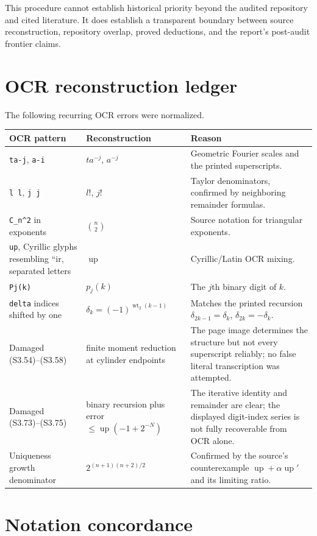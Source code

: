 \documentclass[11pt,oneside]{article}
\theoremstyle{definition}
\theoremstyle{remark}
\newcommand{\Up}{\operatorname{up}}
\newcommand{\wt}{\operatorname{wt}_2}
\begin{document}
This procedure cannot establish historical priority beyond the audited repository and cited
literature.  It does establish a transparent boundary between source reconstruction,
repository overlap, proved deductions, and the report's post-audit frontier claims.

\section{OCR reconstruction ledger}
\label{app:ocr}

The following recurring OCR errors were normalized.

\begin{longtable}{@{}p{}p{}p{}@{}}
\toprule
OCR pattern & Reconstruction & Reason\\
\midrule
\endhead
\texttt{ta-j}, \texttt{a-i} & $ta^{-j}$, $a^{-j}$ & Geometric Fourier scales and the printed superscripts.\\
\texttt{l l}, \texttt{j j} & $l!$, $j!$ & Taylor denominators, confirmed by neighboring remainder formulas.\\
\texttt{C\_n\textasciicircum 2} in exponents & $\binom n2$ & Source notation for triangular exponents.\\
\texttt{up}, Cyrillic glyphs resembling ``ir, separated letters & $\Up$ & Cyrillic/Latin OCR mixing.\\
\texttt{Pj(k)} & $p_j(k)$ & The $j$th binary digit of $k$.\\
\texttt{delta} indices shifted by one & $\delta_k=(-1)^{\wt(k-1)}$ & Matches the printed recursion $\delta_{2k-1}=\delta_k$, $\delta_{2k}=-\delta_k$.\\
Damaged (S3.54)--(S3.58) & finite moment reduction at cylinder endpoints & The page image determines the structure but not every superscript reliably; no false literal transcription was attempted.\\
Damaged (S3.73)--(S3.75) & binary recursion plus error $\le\Up(-1+2^{-N})$ & The iterative identity and remainder are clear; the displayed digit-index series is not fully recoverable from OCR alone.\\
Uniqueness growth denominator & $2^{(n+1)(n+2)/2}$ & Confirmed by the source's counterexample $\Up+\alpha\Up'$ and its limiting ratio.\\
\bottomrule
\end{longtable}

\section{Notation concordance}
\label{app:notation}
\end{document}
